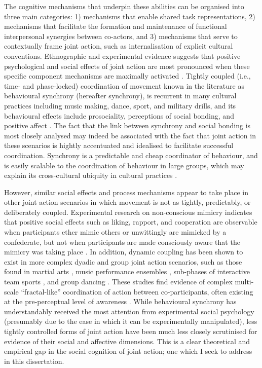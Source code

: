 The cognitive mechanisms that underpin these abilities can be organised into three main categories: 1) mechanisms that enable shared task representations, 2) mechanisms that facilitate the formation and maintenance of functional interpersonal synergies between co-actors, and 3) mechanisms that serve to contextually frame joint action, such as internalisation of explicit cultural conventions\citep{Sebanz2006,Vesper2017}.  Ethnographic and experimental evidence suggests that positive psychological and social effects of joint action are most pronounced when these specific component mechanisms are maximally activated \citep{Durkheim1965,McNeill1995,Mogan2017}.  Tightly coupled (i.e., time- and phase-locked) coordination of movement known in the literature as behavioural synchrony (hereafter synchrony), is recurrent in many cultural practices including music making, dance, sport, and military drills, and its behavioural effects include prosociality, perceptions of social bonding, and positive affect \citep{Mogan2017}.  The fact that the link between synchrony and social bonding is most closely analysed may indeed be associated with the fact that joint action in these scenarios is hightly accentuated and idealised to facilitate successful coordination.  Synchrony is a predictable and cheap coordinator of behaviour, and is easily scalable to the coordination of behaviour in large groups, which may explain its cross-cultural ubiquity in cultural practices \citep{Dunbar2010,Tarr2016}.

However, similar social effects and process mechanisms appear to take place in other joint action scenarios in which movement is not as tightly, predictably, or deliberately coupled.  Experimental research on non-conscious mimicry indicates that positive social effects such as liking, rapport, and cooperation are observable when participants ether mimic others or unwittingly are mimicked by a confederate, but not when participants are made consciously aware that the mimicry was taking place \citep{Bos2008,Lakin2008}.  In addition, dynamic coupling has been shown to exist in more complex dyadic and group joint action scenarios, such as those found in martial arts \citep{Schmidt2011}, music performance ensembles \citep{Demos2014}, sub-phases of interactive team sports \citep{Duarte2013}, and group dancing \citep{Chauvigne2017}. These studies find evidence of complex multi-scale ``fractal-like'' coordination of action between co-participants, often existing at the pre-perceptual level of awareness \citep{Schmidt2011,Riley2011,Fusaroli2013}. While behavioural synchrony has understandably received the most attention from experimental social psychology (presumably due to the ease in which it can be experimentally manipulated), less tightly controlled forms of joint action have been much less closely scrutinised for evidence of their social and affective dimensions\citep[but see]{Marsh2009,Miles2009}.  This is a clear theoretical and empirical gap in the social cognition of joint action; one which I seek to address in this dissertation.

